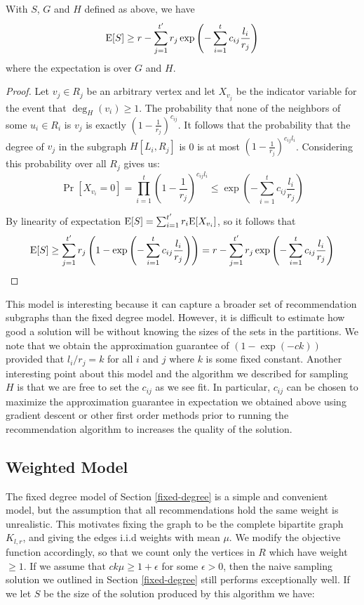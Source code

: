 \begin{thm}
With $S$, $G$ and $H$ defined as above, we have
\[ \text{E}[S] \geq r - \sum_{j=1}^{t'} r_j \exp\left(-\sum_{i=1}^t c_{ij} \frac{l_i}{r_j}\right)\]
where the expectation is over $G$ and $H$.
\end{thm}
\begin{proof}
Let $v_j \in R_j$ be an arbitrary vertex and let $X_{v_j}$ be the
indicator variable for the event that $\deg_H(v_i) \geq 1$. The
probability that none of the neighbors of some $u_i\in R_i$ is $v_j$
is exactly $(1-\frac{1}{r_j})^{c_{ij}}$. It follows that the
probability that the degree of $v_j$ in the subgraph $H[L_i,R_j]$ is 0
is at most $(1-\frac{1}{r_j})^{c_{ij}l_i}$. Considering this
probability over all $R_j$ gives us:
\[ \Pr[X_{v_i} = 0] = \prod_{i=1}^{t} \left(1-\frac{1}{r_j}\right)^{c_{ij} l_i} \leq \exp\left(-\sum_{i=1}^t c_{ij} \frac{l_i}{r_j}\right)\]

By linearity of expectation $\text{E}[S] = \sum_{i=1}^{t'} r_i \text{E}[X_{v_i}]$,
so it follows that
\[ \text{E}[S] \geq \sum_{j=1}^{t'} r_j \left(1-\exp\left(-\sum_{i=1}^t c_{ij} \frac{l_i}{r_j}\right)\right) = r - \sum_{j=1}^{t'} r_j \exp\left(-\sum_{i=1}^t c_{ij} \frac{l_i}{r_j}\right)\]
\end{proof}

This model is interesting because it can capture a broader set of
recommendation subgraphs than the fixed degree model. However, it is
difficult to estimate how good a solution will be without knowing
the sizes of the sets in the partitions. We note that we
obtain the approximation guarantee of $(1-\exp(-ck))$ provided that
$l_i/r_j = k$ for all $i$ and $j$ where $k$ is some fixed
constant. Another interesting point about this model and the algorithm
we described for sampling $H$ is that we are free to set the $c_{ij}$
as we see fit. In particular, $c_{ij}$ can be chosen to maximize the
approximation guarantee in expectation we obtained above using
gradient descent or other first order methods prior to running the
recommendation algorithm to increases the quality of the solution.


\subsection{Weighted Model}
\label{weighted}
The fixed degree model of Section \ref{fixed-degree} is a simple and
convenient model, but the assumption that all recommendations hold the
same weight is unrealistic. This motivates fixing the graph to be the
complete bipartite graph $K_{l,r}$, and giving the edges i.i.d weights
with mean $\mu$. We modify the objective function accordingly, so that
we count only the vertices in $R$ which have weight $\geq 1$. If we
assume that $ck\mu \geq 1+\epsilon$ for some $\epsilon > 0$, then 
the naive sampling solution we outlined in Section \ref{fixed-degree}
still performs exceptionally well. If we let $S$ be the size of the 
solution produced by this algorithm we have:

